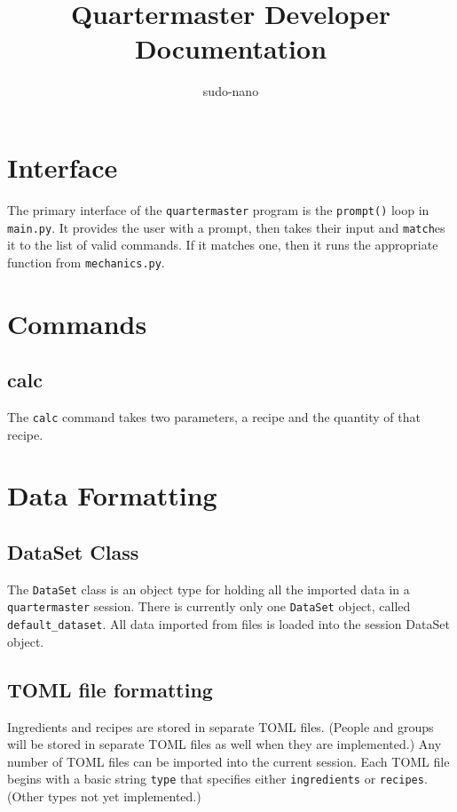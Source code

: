 \documentclass{article}
\title{Quartermaster Developer Documentation}
\author{sudo-nano}
\begin{document}
\maketitle

\tableofcontents

\section{Interface}
The primary interface of the \verb|quartermaster| program is the \verb|prompt()| loop in \verb|main.py|. It provides the user with a prompt, then takes their input and \verb|match|es it to the list of valid commands. If it matches one, then it runs the appropriate function from \verb|mechanics.py|. 


\section{Commands}

\subsection{calc}
The \verb|calc| command takes two parameters, a recipe and the quantity of that recipe. 

\section{Data Formatting}

\subsection{DataSet Class}
The \verb|DataSet| class is an object type for holding all the imported data in a \verb|quartermaster| session. There is currently only one \verb|DataSet| object, called \verb|default_dataset|. 
All data imported from files is loaded into the session DataSet object. 

\subsection{TOML file formatting}
Ingredients and recipes are stored in separate TOML files. (People and groups will be stored in separate TOML files as well when they are implemented.)
Any number of TOML files can be imported into the current session. Each TOML file begins with a basic string \verb|type| that specifies
either \verb|ingredients| or \verb|recipes|. (Other types not yet implemented.)
\end{document}
